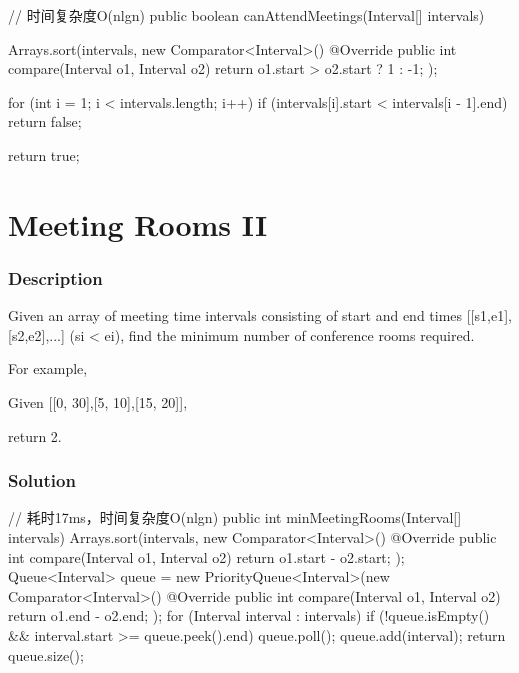 \begin{Code}
// 时间复杂度O(nlgn)
public boolean canAttendMeetings(Interval[] intervals) {
    Arrays.sort(intervals, new Comparator<Interval>() {
        @Override
        public int compare(Interval o1, Interval o2) {
            return o1.start > o2.start ? 1 : -1;
        }
    });

    for (int i = 1; i < intervals.length; i++) {
        if (intervals[i].start < intervals[i - 1].end) {
            return false;
        }
    }

    return true;
}
\end{Code}

\newpage

\section{Meeting Rooms II} %

\subsubsection{Description}
Given an array of meeting time intervals consisting of start and end times [[s1,e1],[s2,e2],...] (si < ei), find the minimum number of conference rooms required.

For example,

Given [[0, 30],[5, 10],[15, 20]],

return 2.

\subsubsection{Solution}

\begin{Code}
// 耗时17ms，时间复杂度O(nlgn)
public int minMeetingRooms(Interval[] intervals) {
    Arrays.sort(intervals, new Comparator<Interval>() {
        @Override
        public int compare(Interval o1, Interval o2) {
            return o1.start - o2.start;
        }
    });
    Queue<Interval> queue = new PriorityQueue<Interval>(new Comparator<Interval>() {
        @Override
        public int compare(Interval o1, Interval o2) {
            return o1.end - o2.end;
        }
    });
    for (Interval interval : intervals) {
        if (!queue.isEmpty() && interval.start >= queue.peek().end) {
            queue.poll();
        }
        queue.add(interval);
    }
    return queue.size();
}
\end{Code}

